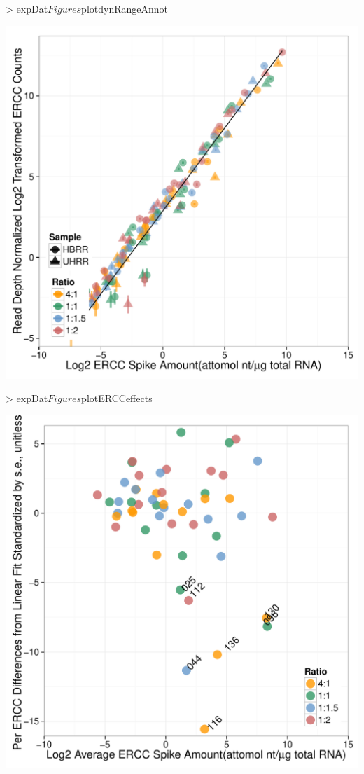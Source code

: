 \documentclass{article}
\begin{document}
\clearpage
\begin{center}
\begin{Schunk}
\begin{Sinput}
> expDat$Figures$plotdynRangeAnnot
\end{Sinput}
\end{Schunk}
\includegraphics{erccdashboardVignette-printPanelD}
\end{center}
\clearpage
\begin{center}
\begin{Schunk}
\begin{Sinput}
> expDat$Figures$plotERCCeffects
\end{Sinput}
\end{Schunk}
\includegraphics{erccdashboardVignette-printPanelE}
\end{center}
\end{document}
